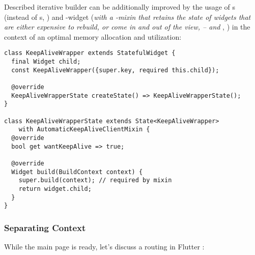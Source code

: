 \hspace{0.5cm}
\hspace{1cm}

\noindent Described iterative builder can be additionally improved by the usage of s (instead of s, 
) and -widget (\emph{with a -mixin that retains the 
state of widgets that are either expensive to rebuild, or come in and out of the view, --  and 
}, ) in the context of an optimal memory allocation and utilization:

\begin{lstlisting}
class KeepAliveWrapper extends StatefulWidget {
  final Widget child;
  const KeepAliveWrapper({super.key, required this.child});

  @override
  KeepAliveWrapperState createState() => KeepAliveWrapperState();
}

class KeepAliveWrapperState extends State<KeepAliveWrapper> 
    with AutomaticKeepAliveClientMixin {
  @override
  bool get wantKeepAlive => true;

  @override
  Widget build(BuildContext context) {
    super.build(context); // required by mixin
    return widget.child;
  }
}
\end{lstlisting}


\subsubsection{Separating Context}

\noindent While the main page is ready, let's discuss a routing in Flutter :

